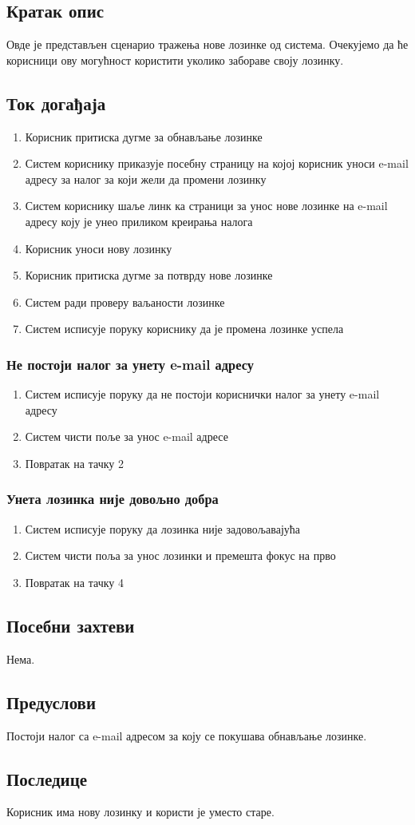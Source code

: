 \subsection{Кратак опис}
Овде је представљен сценарио тражења нове лозинке од система. Очекујемо да ће корисници ову
могућност користити уколико забораве своју лозинку.

\subsection{Ток догађаја}
\begin{enumerate}
	\item Корисник притиска дугме за обнављање лозинке
	\item Систем кориснику приказује посебну страницу на којој корисник уноси e-mail
		  адресу за налог за који жели да промени лозинку
	\item Систем кориснику шаље линк ка страници за унос нове лозинке на e-mail адресу коју је
	      унео приликом креирања налога
	\item Корисник уноси нову лозинку
	\item Корисник притиска дугме за потврду нове лозинке
	\item Систем ради проверу ваљаности лозинке
	\item Систем исписује поруку кориснику да је промена лозинке успела
\end{enumerate}

\subsubsection{Не постоји налог за унету e-mail адресу}
\begin{enumerate}[label=2.\arabic*]
	\item Систем исписује поруку да не постоји кориснички налог за унету e-mail адресу
	\item Систем чисти поље за унос e-mail адресе
	\item Повратак на тачку 2
\end{enumerate}


\subsubsection{Унета лозинка није довољно добра}
\begin{enumerate}[label=6.\arabic*]
	\item Систем исписује поруку да лозинка није задовољавајућа
	\item Систем чисти поља за унос лозинки и премешта фокус на прво
	\item Повратак на тачку 4
\end{enumerate}

\subsection{Посебни захтеви}
Нема.

\subsection{Предуслови}
Постоји налог са e-mail адресом за коју се покушава обнављање лозинке.

\subsection{Последице}
Корисник има нову лозинку и користи је уместо старе.
